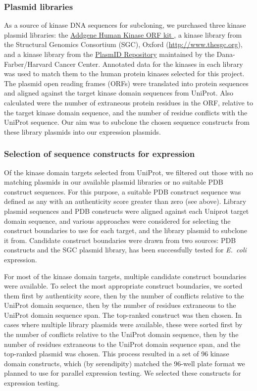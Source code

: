 \documentclass[phd,tocprelim]{cornell}
\begin{document}
\subsubsection{Plasmid libraries}

As a source of kinase DNA sequences for subcloning, we purchased three kinase plasmid libraries: the \href{https://www.addgene.org/human-kinase/}{Addgene Human Kinase ORF kit }, a kinase library from the Structural Genomics Consortium (SGC), Oxford (\url{http://www.thesgc.org}), and a kinase library from the \href{https://plasmid.med.harvard.edu/PLASMID/Home.xhtml}{PlasmID Repository} maintained by the Dana-Farber/Harvard Cancer Center. Annotated data for the kinases in each library was used to match them to the human protein kinases selected for this project.
The plasmid open reading frames (ORFs) were translated into protein sequences and aligned against the target kinase domain sequences from UniProt.
Also calculated were the number of extraneous protein residues in the ORF, relative to the target kinase domain sequence, and the number of residue conflicts with the UniProt sequence. Our aim was to subclone the chosen sequence constructs from these library plasmids into our expression plasmids. 

\subsubsection{Selection of sequence constructs for expression}

Of the kinase domain targets selected from UniProt, we filtered out those with no matching plasmids in our available plasmid libraries or no suitable PDB construct sequences.
For this purpose, a suitable PDB construct sequence was defined as any with an authenticity score greater than zero (see above). 
Library plasmid sequences and PDB constructs were aligned against each Uniprot target domain sequence, and various approaches were considered for selecting the construct boundaries to use for each target, and the library plasmid to subclone it from.
Candidate construct boundaries were drawn from two sources: PDB constructs and the SGC plasmid library, has been successfully tested for \emph{E.~coli} expression.

For most of the kinase domain targets, multiple candidate construct boundaries were available.
To select the most appropriate construct boundaries, we sorted them first by authenticity score, then by the number of conflicts relative to the UniProt domain sequence, then by the number of residues extraneous to the UniProt domain sequence span.
The top-ranked construct was then chosen.
In cases where multiple library plasmids were available, these were sorted first by the number of conflicts relative to the UniProt domain sequence, then by the number of residues extraneous to the UniProt domain sequence span, and the top-ranked plasmid was chosen.
This process resulted in a set of 96 kinase domain constructs, which (by serendipity) matched the 96-well plate format we planned to use for parallel expression testing.
We selected these constructs for expression testing.
\end{document}
